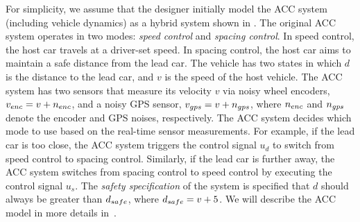 %
%
For simplicity, we assume that the designer initially model the ACC system (including vehicle dynamics) as a hybrid system shown in .
% 
The original ACC system operates in two modes: \emph{speed control} and \emph{spacing control}. In speed control, the host car travels at a driver-set speed. In spacing control, the host car aims to maintain a safe distance from the lead car. 
%
The vehicle has two states in which $d$ is the distance to the lead car, and $v$ is the speed of the host vehicle. The ACC system has two sensors that measure its velocity $v$ via noisy wheel encoders, $v_{enc} = v + n_{enc}$, and a noisy GPS sensor, $v_{gps} = v+n_{gps}$, where $n_{enc}$ and $n_{gps}$ denote the encoder and GPS noises, respectively. 
%
The ACC system decides which mode to use based on the real-time sensor measurements. For example, if the lead car is too close, the ACC system triggers the control signal $u_d$ to switch from speed control to spacing control. Similarly, if the lead car is further away, the ACC system switches from spacing control to speed control by executing the control signal $u_s$. 
%
The \emph{safety specification} of the system is specified that $d$ should always be greater than $d_{safe}$, where $d_{safe} = v + 5$. We will describe the ACC model in more details in~.
%
% 
%
